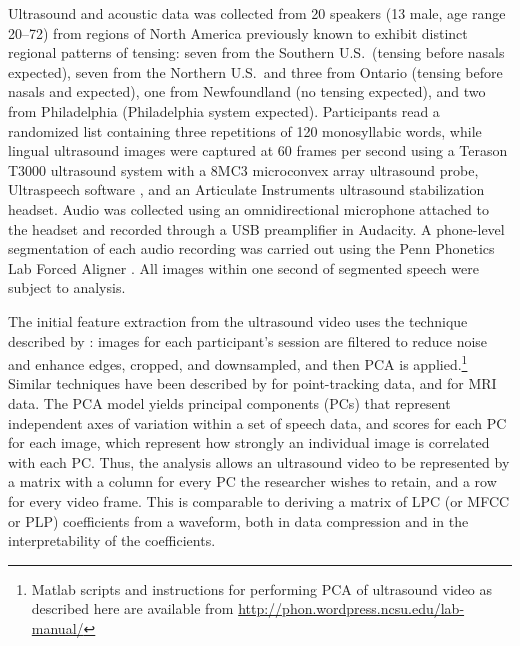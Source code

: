 \documentclass[output=paper]{LSP/langsci}
\begin{document}
Ultrasound and acoustic data was collected from 20 speakers (13 male, age range 20--72) from regions of North America previously known to exhibit distinct regional patterns of \ips{\ae} tensing: seven from the Southern U.S.~(tensing before nasals expected), seven from the Northern U.S.~and three from Ontario (tensing before nasals and  expected), one from Newfoundland (no tensing expected), and two from Philadelphia (Philadelphia system expected). Participants read a randomized list containing three repetitions of 120 monosyllabic words, while lingual ultrasound images were captured at 60 frames per second using a Terason T3000 ultrasound system with a 8MC3 microconvex array ultrasound probe, Ultraspeech software \citep{hueber_eigentongue_2007}, and an Articulate Instruments ultrasound stabilization headset.  Audio was collected using an omnidirectional microphone attached to the headset and recorded through a USB preamplifier in Audacity. A phone-level segmentation of each audio recording was carried out using the Penn Phonetics Lab Forced Aligner \citep{yuan_speaker_2008}.  All images within one second of segmented speech were subject to analysis.

The initial feature extraction from the ultrasound video uses the technique described by \citet{hueber_eigentongue_2007}: images for each participant's session are filtered to reduce noise and enhance edges, cropped, and downsampled, and then PCA is applied.\footnote{Matlab scripts and instructions for performing PCA of ultrasound video as described here are available from \href{http://phon.wordpress.ncsu.edu/lab-manual/}{http://phon.wordpress.ncsu.edu/lab-manual/}}  Similar techniques have been described by \citet{story_time_2007} for point-tracking data, and \citet{carignan_real-time_2015} for MRI data.  The PCA model yields principal components (PCs) that represent independent axes of variation within a set of speech data, and scores for each PC for each image, which represent how strongly an individual image is correlated with each PC. Thus, the analysis allows an ultrasound video to be represented by a matrix with a column for every PC the researcher wishes to retain, and a row for every video frame.  This is comparable to deriving a matrix of LPC (or MFCC or PLP) coefficients from a waveform, both in data compression and in the interpretability of the coefficients. 
\end{document}
